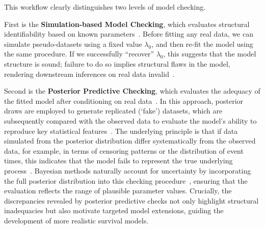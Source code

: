This workflow clearly distinguishes two levels of model checking.

First is the \textbf{Simulation-based Model Checking}, which evaluates structural identifiability based on known parameters~\cite{10.1093/bioinformatics/btp358}. Before fitting any real data, we can simulate pseudo-datasets using a fixed value $\lambda_0$, and then re-fit the model using the same procedure. If we successfully “recover” $\lambda_0$, this suggests that the model structure is sound; failure to do so implies structural flaws in the model, rendering downstream inferences on real data invalid~\cite{10.1093/bioinformatics/btp358, pub.1044073403}.

Second is the \textbf{Posterior Predictive Checking}, which evaluates the adequacy of the fitted model after conditioning on real data~\cite{https://doi.org/10.1002/ecm.1314}. In this approach, posterior draws are employed to generate replicated (‘fake’) datasets, which are subsequently compared with the observed data to evaluate the model’s ability to reproduce key statistical features~\cite{https://doi.org/10.1002/ecm.1314}. The underlying principle is that if data simulated from the posterior distribution differ systematically from the observed data, for example, in terms of censoring patterns or the distribution of event times, this indicates that the model fails to represent the true underlying process~\cite{62bfc978-09b1-3997-9776-380d0b45e9c2}. Bayesian methods naturally account for uncertainty by incorporating the full posterior distribution into this checking procedure~\cite{van2021bayesian}, ensuring that the evaluation reflects the range of plausible parameter values. Crucially, the discrepancies revealed by posterior predictive checks not only highlight structural inadequacies but also motivate targeted model extensions, guiding the development of more realistic survival models.


